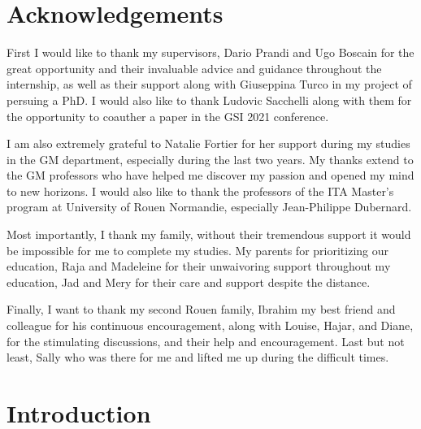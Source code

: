 \documentclass[american,]{article}
\theoremstyle{definition}
\theoremstyle{definition}
\theoremstyle{definition}
\theoremstyle{remark}
\begin{document}
\def\Aut{\mathrm{Aut}}

\def\qtext#1{\quad\text{#1}\quad}

\def\argmin{\mathop{\mathrm{argmin}}}
\def\argmax{\mathop{\mathrm{argmax}}}
\def\supp{\mathop{\mathrm{supp}}}

\def\transp#1{{#1}^{\top}}

\def\stft #1{\mathrm{STFT}\sset{#1}}
\def\STFT{\mathrm{STFT}}
\def\Proj{\mathrm{Proj}}

\def\Cd{\mathrm{Cauchy}}
\def\Nd{\mathcal{N}}
\def\med{\mathrm{median}}

\pagebreak

\hypertarget{acknowledgements}{%
\section*{Acknowledgements}\label{acknowledgements}}

First I would like to thank my supervisors, Dario Prandi and Ugo Boscain
for the great opportunity and their invaluable advice and guidance throughout the internship,
as well as their support along with Giuseppina Turco in my project of persuing a PhD.
I would also like to thank Ludovic Sacchelli along with them for the opportunity
to coauther a paper in the GSI 2021 conference.

I am also extremely grateful to Natalie Fortier for her support during my studies
in the GM department, especially during the last two years.
My thanks extend to the GM professors who have helped me discover my passion
and opened my mind to new horizons.
I would also like to thank the professors of the ITA Master's program
at University of Rouen Normandie, especially Jean-Philippe Dubernard.

Most importantly, I thank my family, without their tremendous support
it would be impossible for me to complete my studies.
My parents for prioritizing our education, Raja and Madeleine
for their unwaivoring support throughout my education,
Jad and Mery for their care and support despite the distance.

Finally, I want to thank my second Rouen family, Ibrahim
my best friend and colleague for his continuous encouragement,
along with Louise, Hajar, and Diane, for the stimulating discussions,
and their help and encouragement.
Last but not least, Sally who was there for me and lifted me up
during the difficult times.

\pagebreak

\hypertarget{introduction}{%
\section{Introduction}\label{introduction}}
\end{document}
